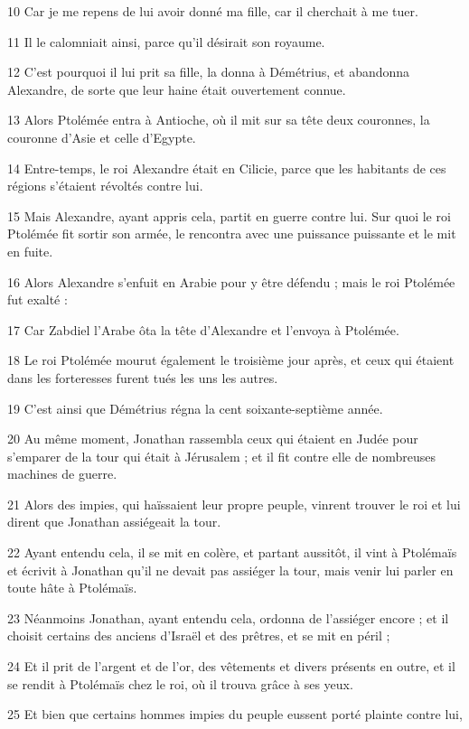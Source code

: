 \par 10 Car je me repens de lui avoir donné ma fille, car il cherchait à me tuer.
\par 11 Il le calomniait ainsi, parce qu'il désirait son royaume.
\par 12 C'est pourquoi il lui prit sa fille, la donna à Démétrius, et abandonna Alexandre, de sorte que leur haine était ouvertement connue.
\par 13 Alors Ptolémée entra à Antioche, où il mit sur sa tête deux couronnes, la couronne d'Asie et celle d'Egypte.
\par 14 Entre-temps, le roi Alexandre était en Cilicie, parce que les habitants de ces régions s'étaient révoltés contre lui.
\par 15 Mais Alexandre, ayant appris cela, partit en guerre contre lui. Sur quoi le roi Ptolémée fit sortir son armée, le rencontra avec une puissance puissante et le mit en fuite.
\par 16 Alors Alexandre s'enfuit en Arabie pour y être défendu ; mais le roi Ptolémée fut exalté :
\par 17 Car Zabdiel l'Arabe ôta la tête d'Alexandre et l'envoya à Ptolémée.
\par 18 Le roi Ptolémée mourut également le troisième jour après, et ceux qui étaient dans les forteresses furent tués les uns les autres.
\par 19 C'est ainsi que Démétrius régna la cent soixante-septième année.
\par 20 Au même moment, Jonathan rassembla ceux qui étaient en Judée pour s'emparer de la tour qui était à Jérusalem ; et il fit contre elle de nombreuses machines de guerre.
\par 21 Alors des impies, qui haïssaient leur propre peuple, vinrent trouver le roi et lui dirent que Jonathan assiégeait la tour.
\par 22 Ayant entendu cela, il se mit en colère, et partant aussitôt, il vint à Ptolémaïs et écrivit à Jonathan qu'il ne devait pas assiéger la tour, mais venir lui parler en toute hâte à Ptolémaïs.
\par 23 Néanmoins Jonathan, ayant entendu cela, ordonna de l'assiéger encore ; et il choisit certains des anciens d'Israël et des prêtres, et se mit en péril ;
\par 24 Et il prit de l'argent et de l'or, des vêtements et divers présents en outre, et il se rendit à Ptolémaïs chez le roi, où il trouva grâce à ses yeux.
\par 25 Et bien que certains hommes impies du peuple eussent porté plainte contre lui,
